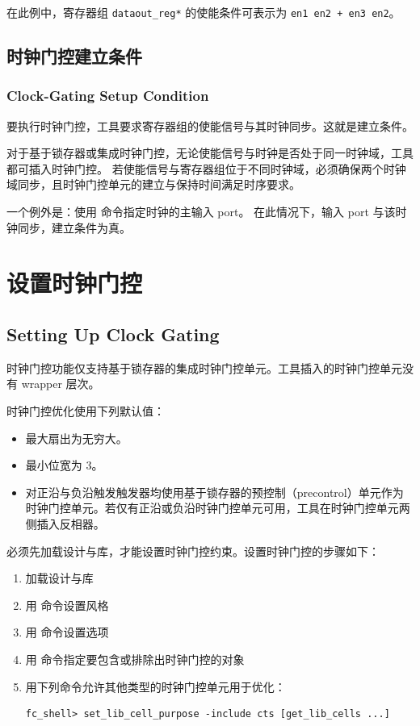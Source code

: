 在此例中，寄存器组 \texttt{dataout\_reg*} 的使能条件可表示为 \texttt{en1 en2 + en3 en2}。

\subsection{时钟门控建立条件}
\subsubsection*{Clock-Gating Setup Condition}

要执行时钟门控，工具要求寄存器组的使能信号与其时钟同步。这就是建立条件。

对于基于锁存器或集成时钟门控，无论使能信号与时钟是否处于同一时钟域，工具都可插入时钟门控。
若使能信号与寄存器组位于不同时钟域，必须确保两个时钟域同步，且时钟门控单元的建立与保持时间满足时序要求。

一个例外是：使用  命令指定时钟的主输入 port。
在此情况下，输入 port 与该时钟同步，建立条件为真。

\section{设置时钟门控}
\subsection*{Setting Up Clock Gating}

时钟门控功能仅支持基于锁存器的集成时钟门控单元。工具插入的时钟门控单元没有 wrapper 层次。

时钟门控优化使用下列默认值：
\begin{itemize}
  \item 最大扇出为无穷大。
  \item 最小位宽为 3。
  \item 对正沿与负沿触发触发器均使用基于锁存器的预控制（precontrol）单元作为时钟门控单元。若仅有正沿或负沿时钟门控单元可用，工具在时钟门控单元两侧插入反相器。
\end{itemize}

必须先加载设计与库，才能设置时钟门控约束。设置时钟门控的步骤如下：
\begin{enumerate}
  \item 加载设计与库
  \item 用  命令设置风格
  \item 用  命令设置选项
  \item 用  命令指定要包含或排除出时钟门控的对象
  \item 用下列命令允许其他类型的时钟门控单元用于优化：
\begin{lstlisting}
fc_shell> set_lib_cell_purpose -include cts [get_lib_cells ...]
\end{lstlisting}
\end{enumerate}

